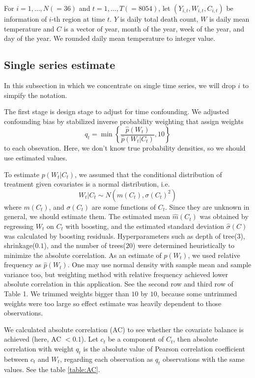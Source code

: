\documentclass[12pt]{article}
\begin{document}
For $i = 1, \dots, N(=36)$ and $t = 1, \dots, T(=8054)$, 
let $(Y_{i,t}, W_{i,t}, C_{i,t})$ be information of $i$-th region at time $t$.
$Y$ is daily total death count, $W$ is daily mean temperature 
and $C$ is a vector of year, month of the year, week of the year, and day of the year.
We rounded daily mean temperature to integer value.

\subsection{Single series estimate}

In this subsection in which we concentrate on single time series, 
we will drop $i$ to simpify the notation.

The first stage is design stage to adjust for time confounding.
We adjusted confounding bias by stabilized inverse probability weighting\cite{sipw2010}
that assign weights
\[
	q_t = \min{ \left \{ \frac{\hat{p}(W_t)}{\hat{p}(W_t \lvert C_t)}, 10 \right \} }
\]
to each obsevation.
Here, we don't know true probability densities,
so we should use estimated values.

To estimate $p(W_t \lvert C_t)$, 
we assumed that 
the conditional distribution of treatment given covariates is a normal distribution, i.e.
\[ 
	W_t\lvert C_t \sim N(m(C_t), \sigma(C_t)^2) 
\] 
where $m(C_t)$, and $\sigma(C_t)$ are some functions of $C_t$.
Since they are unknown in general, we should estimate them. 
The estimated mean $\hat{m}(C_t)$ was obtained by regressing $W_t$ on $C_t$ with boosting, 
and the estimated standard deviation $\hat{\sigma}(C)$ was calculated
by boosting residuals\cite{hirano2004, gpsboosting2015}.
Hyperparameters such as depth of tree($3$), shrinkage($0.1$), and the number of trees($20$) 
were determined heuristically to minimize the absolute correlation.
As an estimate of $p(W_t)$, we used relative frequency as $\hat{p}(W_t)$.
One may use normal density with sample mean and sample variance too, but
weighting method with relative frequency achieved lower absolute correlation in this application.
See the second row and third row of Table 1.
We trimmed weights bigger than $10$ by $10$,
because some untrimmed weights were too large so
effect estimate was heavily dependent to those observations.

We calculated absolute correlation (AC)\cite{gpsboosting2015} 
to see whether the covariate balance is achieved (here, AC $<0.1$).
Let $c_t$ be a component of $C_t$, then absolute correlation with weight $q_t$ is
the absolute value of Pearson correlation coefficient between $c_t$ and $W_t$,
regarding each observation as $q_t$ observations with the same values.
See the table \ref{table:AC}.
\end{document}
